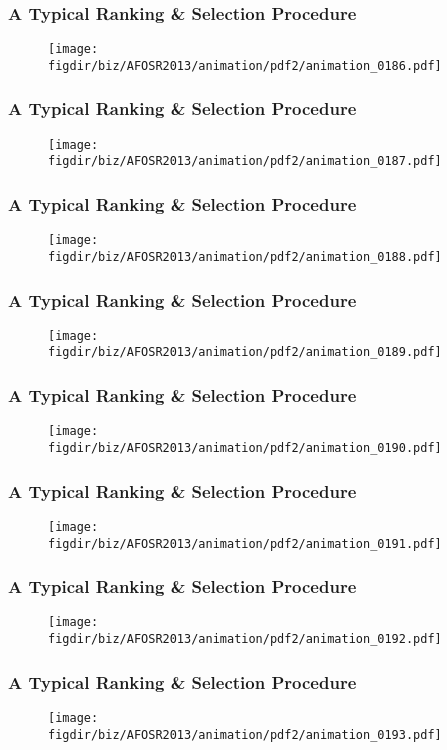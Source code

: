 \documentclass[13pt]{beamer}
\newcommand{\figdir}{../../fig}
\begin{document}
{\begin{frame}\frametitle{A Typical Ranking \& Selection Procedure}\begin{figure}\texttt{[image: \\figdir/biz/AFOSR2013/animation/pdf2/animation\_0186.pdf]}\end{figure}\end{frame}
\begin{frame}\frametitle{A Typical Ranking \& Selection Procedure}\begin{figure}\texttt{[image: \\figdir/biz/AFOSR2013/animation/pdf2/animation\_0187.pdf]}\end{figure}\end{frame}
\begin{frame}\frametitle{A Typical Ranking \& Selection Procedure}\begin{figure}\texttt{[image: \\figdir/biz/AFOSR2013/animation/pdf2/animation\_0188.pdf]}\end{figure}\end{frame}
\begin{frame}\frametitle{A Typical Ranking \& Selection Procedure}\begin{figure}\texttt{[image: \\figdir/biz/AFOSR2013/animation/pdf2/animation\_0189.pdf]}\end{figure}\end{frame}
\begin{frame}\frametitle{A Typical Ranking \& Selection Procedure}\begin{figure}\texttt{[image: \\figdir/biz/AFOSR2013/animation/pdf2/animation\_0190.pdf]}\end{figure}\end{frame}
\begin{frame}\frametitle{A Typical Ranking \& Selection Procedure}\begin{figure}\texttt{[image: \\figdir/biz/AFOSR2013/animation/pdf2/animation\_0191.pdf]}\end{figure}\end{frame}
\begin{frame}\frametitle{A Typical Ranking \& Selection Procedure}\begin{figure}\texttt{[image: \\figdir/biz/AFOSR2013/animation/pdf2/animation\_0192.pdf]}\end{figure}\end{frame}
\begin{frame}\frametitle{A Typical Ranking \& Selection Procedure}\begin{figure}\texttt{[image: \\figdir/biz/AFOSR2013/animation/pdf2/animation\_0193.pdf]}\end{figure}\end{frame}
}
\end{document}
